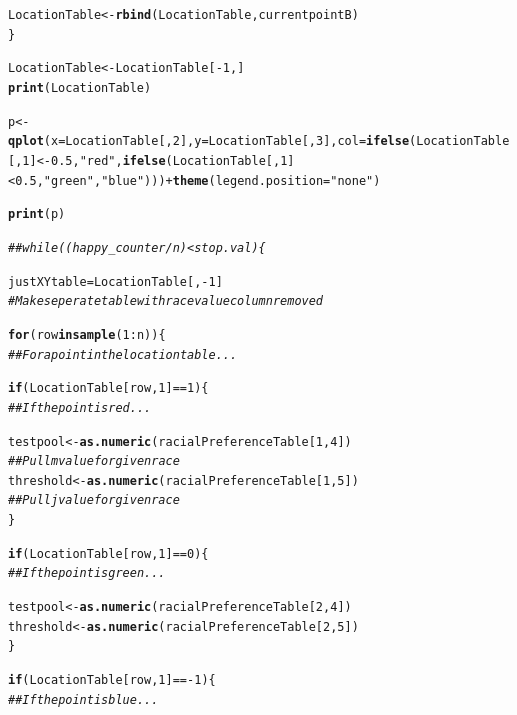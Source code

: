 \documentclass{article}\usepackage[]{graphicx}\usepackage[]{color}
\makeatletter
\newcommand{\hlnum}[1]{\textcolor[rgb]{0.686,0.059,0.569}{#1}}%
\newcommand{\hlstr}[1]{\textcolor[rgb]{0.192,0.494,0.8}{#1}}%
\newcommand{\hlcom}[1]{\textcolor[rgb]{0.678,0.584,0.686}{\textit{#1}}}%
\newcommand{\hlopt}[1]{\textcolor[rgb]{0,0,0}{#1}}%
\newcommand{\hlstd}[1]{\textcolor[rgb]{0.345,0.345,0.345}{#1}}%
\newcommand{\hlkwa}[1]{\textcolor[rgb]{0.161,0.373,0.58}{\textbf{#1}}}%
\newcommand{\hlkwb}[1]{\textcolor[rgb]{0.69,0.353,0.396}{#1}}%
\newcommand{\hlkwc}[1]{\textcolor[rgb]{0.333,0.667,0.333}{#1}}%
\newcommand{\hlkwd}[1]{\textcolor[rgb]{0.737,0.353,0.396}{\textbf{#1}}}%
\newenvironment{kframe}{%
 \def\at@end@of@kframe{}%
 \ifinner\ifhmode%
  \def\at@end@of@kframe{\end{minipage}}%
  \begin{minipage}{\columnwidth}%
 \fi\fi%
 \def\FrameCommand##1{\hskip\@totalleftmargin \hskip-\fboxsep
 \colorbox{shadecolor}{##1}\hskip-\fboxsep
     \hskip-\linewidth \hskip-\@totalleftmargin \hskip\columnwidth}%
 \MakeFramed {\advance\hsize-\width
   \@totalleftmargin\z@ \linewidth\hsize
   \@setminipage}}%
 {\par\unskip\endMakeFramed%
 \at@end@of@kframe}
\newenvironment{knitrout}{}{} %
\makeatother
\begin{document}
\begin{knitrout}
\begin{kframe}
\begin{alltt}
    \hlstd{LocationTable} \hlkwb{<-} \hlkwd{rbind}\hlstd{(LocationTable, currentpointB)}
  \hlstd{\}}

  \hlstd{LocationTable} \hlkwb{<-} \hlstd{LocationTable[}\hlopt{-}\hlnum{1}\hlstd{,]}
  \hlkwd{print}\hlstd{(LocationTable)}

  \hlstd{p} \hlkwb{<-} \hlkwd{qplot}\hlstd{(}\hlkwc{x} \hlstd{= LocationTable[,}\hlnum{2}\hlstd{],} \hlkwc{y} \hlstd{= LocationTable [,}\hlnum{3}\hlstd{],} \hlkwc{col} \hlstd{=} \hlkwd{ifelse}\hlstd{(LocationTable[,}\hlnum{1}\hlstd{]} \hlopt{< -}\hlnum{0.5}\hlstd{,} \hlstr{"red"}\hlstd{,} \hlkwd{ifelse}\hlstd{(LocationTable[,}\hlnum{1}\hlstd{]} \hlopt{<} \hlnum{0.5}\hlstd{,} \hlstr{"green"}\hlstd{,} \hlstr{"blue"}\hlstd{)))} \hlopt{+} \hlkwd{theme}\hlstd{(}\hlkwc{legend.position} \hlstd{=} \hlstr{"none"}\hlstd{)}

  \hlkwd{print}\hlstd{(p)}


  \hlcom{##while ((happy_counter/n) < stop.val)\{}

    \hlstd{justXYtable} \hlkwb{=} \hlstd{LocationTable[,}\hlopt{-}\hlnum{1}\hlstd{]}
    \hlcom{#Make seperate table with race value column removed}

    \hlkwa{for} \hlstd{(row} \hlkwa{in} \hlkwd{sample}\hlstd{(}\hlnum{1}\hlopt{:}\hlstd{n))\{}
    \hlcom{## For a point in the location table...}

      \hlkwa{if} \hlstd{(LocationTable[row,}\hlnum{1}\hlstd{]} \hlopt{==} \hlnum{1}\hlstd{)\{}
      \hlcom{##If the point is red...}

        \hlstd{testpool} \hlkwb{<-} \hlkwd{as.numeric}\hlstd{(racialPreferenceTable[}\hlnum{1}\hlstd{,}\hlnum{4}\hlstd{])}
        \hlcom{## Pull m value for given race}
        \hlstd{threshold} \hlkwb{<-} \hlkwd{as.numeric}\hlstd{(racialPreferenceTable[}\hlnum{1}\hlstd{,}\hlnum{5}\hlstd{])}
        \hlcom{##Pull j value for given race}
      \hlstd{\}}

      \hlkwa{if}\hlstd{(LocationTable[row,}\hlnum{1}\hlstd{]} \hlopt{==} \hlnum{0}\hlstd{)\{}
      \hlcom{##If the point is green...}

        \hlstd{testpool} \hlkwb{<-} \hlkwd{as.numeric}\hlstd{(racialPreferenceTable[}\hlnum{2}\hlstd{,}\hlnum{4}\hlstd{])}
        \hlstd{threshold} \hlkwb{<-} \hlkwd{as.numeric}\hlstd{(racialPreferenceTable[}\hlnum{2}\hlstd{,}\hlnum{5}\hlstd{])}
      \hlstd{\}}

      \hlkwa{if}\hlstd{(LocationTable[row,}\hlnum{1}\hlstd{]} \hlopt{== -}\hlnum{1}\hlstd{)\{}
      \hlcom{##If the point is blue...}


\end{alltt}
\end{kframe}
\end{knitrout}
\end{document}
